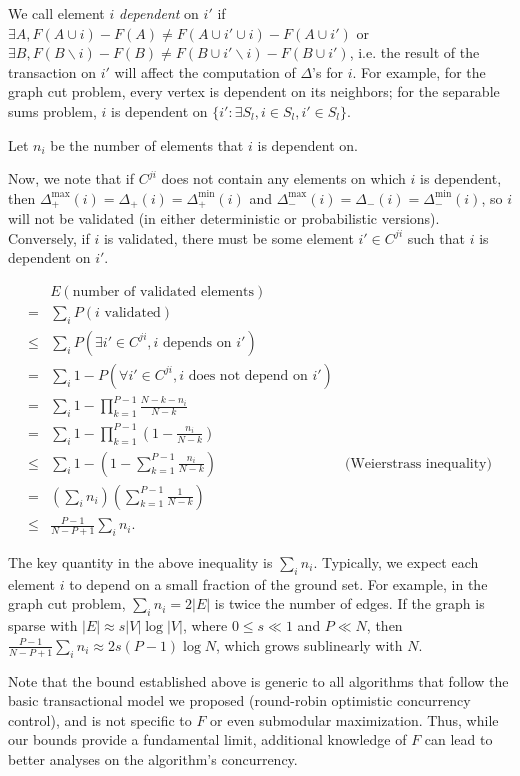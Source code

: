 \documentclass{article} %
\begin{document}
We call element $i$ \textit{dependent} on $i'$ if $\exists A, F(A\cup i)-F(A) \neq F(A\cup i' \cup i)-F(A\cup i')$ or $\exists B, F(B\backslash i)-F(B) \neq F(B\cup i'\backslash i) - F(B\cup i')$, i.e. the result of the transaction on $i'$ will affect the computation of $\Delta$'s for $i$.
For example, for the graph cut problem, every vertex is dependent on its neighbors; for the separable sums problem, $i$ is dependent on $\{i': \exists S_l, i\in S_l, i'\in S_l\}$.

Let $n_i$ be the number of elements that $i$ is dependent on.

Now, we note that if $C^{ji}$ does not contain any elements on which $i$ is dependent, then $\Delta_{+}^\text{max}(i) = \Delta_{+}(i) = \Delta_{+}^\text{min}(i)$ and $\Delta_{-}^\text{max}(i) = \Delta_{-}(i) = \Delta_{-}^\text{min}(i)$, so $i$ will not be validated (in either deterministic or probabilistic versions).
Conversely, if $i$ is validated, there must be some element $i'\in C^{ji}$ such that $i$ is dependent on $i'$.

\begin{align*}
&E(\text{number of validated elements})\\
=& \sum_i P(i \text{ validated})\\
\leq& \sum_i P(\exists i'\in C^{ji}, i \text{ depends on } i')\\
=& \sum_i 1-P(\forall i'\in C^{ji}, i \text{ does not depend on } i')\\
=& \sum_i 1-\prod_{k=1}^{P-1}\frac{N-k-n_i}{N-k}\\
=& \sum_i 1-\prod_{k=1}^{P-1}\left(1-\frac{n_i}{N-k}\right)\\
\leq& \sum_i 1-\left(1-\sum_{k=1}^{P-1}\frac{n_i}{N-k}\right) & \text{(Weierstrass inequality)}\\
=& \left(\sum_i n_i\right)\left(\sum_{k=1}^{P-1}\frac{1}{N-k}\right)\\
\leq& \frac{P-1}{N-P+1}\sum_i n_i.
\end{align*}

The key quantity in the above inequality is $\sum_i n_i$.
Typically, we expect each element $i$ to depend on a small fraction of the ground set.
For example, in the graph cut problem, $\sum_i n_i = 2|E|$ is twice the number of edges.
If the graph is sparse with $|E|\approx s|V|\log|V|$, where $0\leq s\ll 1$ and $P\ll N$, then $\frac{P-1}{N-P+1}\sum_i n_i \approx 2s(P-1)\log N$, which grows sublinearly with $N$.

Note that the bound established above is generic to all algorithms that follow the basic transactional model we proposed (round-robin optimistic concurrency control), and is not specific to $F$ or even submodular maximization.
Thus, while our bounds provide a fundamental limit, additional knowledge of $F$ can lead to better analyses on the algorithm's concurrency.
\end{document}
